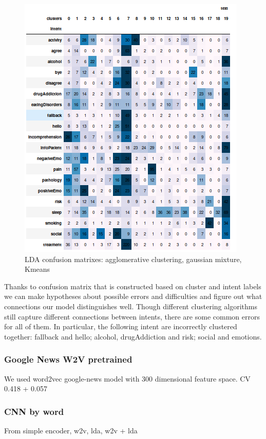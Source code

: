 \documentclass[11pt]{article}
\begin{document}
\begin{figure}[h]
	\includegraphics[scale=0.28]{lda_km_cm.png}
	\caption{LDA confusion matrixes: agglomerative clustering, gaussian mixture, Kmeans}
\label{lda_gm_cm}
\end{figure}
\FloatBarrier

Thanks to confusion matrix that is constructed based on cluster and
intent labels we can make hypotheses about possible errors and
difficulties and figure out what connections our model distinguishes
well. Though different clustering algorithms still capture different
connections between intents, there are some common errors for all of
them. In particular, the following intent are incorrectly clustered
together: fallback and hello; alcohol, drugAddiction and risk; social
and emotions.

\subsubsection{Google News W2V pretrained}
We used word2vec google-news model with 300 dimensional feature space.
CV 0.418 + 0.057%
\subsubsection{CNN by word}
From simple encoder, w2v, lda, w2v + lda
\end{document}
